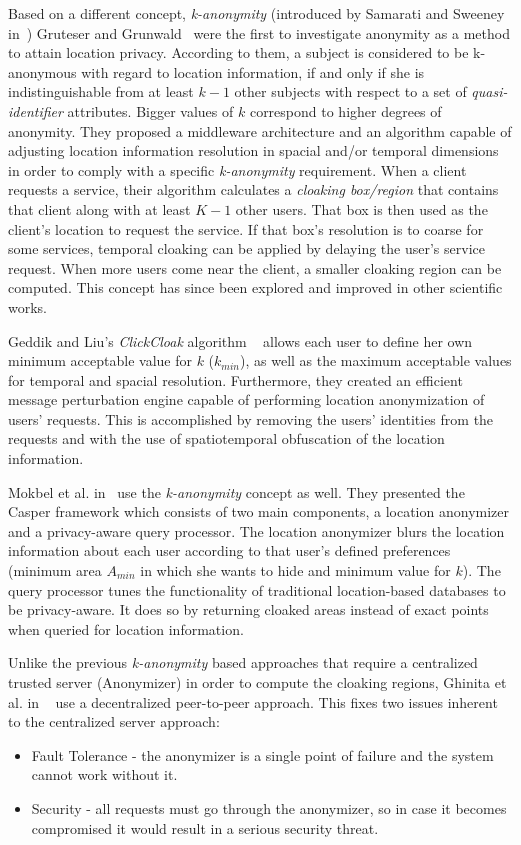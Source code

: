 Based on a different concept, \emph{k-anonymity} (introduced by
Samarati and Sweeney in~\cite{samarati1998protecting}) Gruteser and
Grunwald~\cite{gruteser2003anonymous} were the first to investigate
anonymity as a method to attain location privacy. According to them, a
subject is considered to be k-anonymous with regard to location
information, if and only if she is indistinguishable from at least
$k-1$ other subjects with respect to a set of
\emph{quasi-identifier} attributes. Bigger values of $k$ correspond to higher degrees of
anonymity. They proposed a middleware architecture and an algorithm
capable of adjusting location information resolution in spacial and/or
temporal dimensions in order to comply with a specific
\emph{k-anonymity} requirement. When a client requests a service,
their algorithm calculates a \emph{cloaking box/region} that contains
that client along with at least $K-1$ other users. That box is then
used as the client's location to request the service. If that box's
resolution is to coarse for some services, temporal cloaking can be
applied by delaying the user's service request. When more users come
near the client, a smaller cloaking region can be computed. This concept
has since been explored and improved in other scientific works.

Geddik and Liu's
\emph{ClickCloak} algorithm
~\cite{gedik2005location,gedik2008protecting} allows each user to
define her own minimum acceptable value for $k$ ($k_{min}$), as well
as the maximum acceptable values for temporal and spacial resolution.
Furthermore, they created an efficient message perturbation engine
capable of performing location anonymization of users' requests.
This is accomplished by removing the users' identities from the
requests and with the use of spatiotemporal obfuscation of the
location information.

Mokbel et al. in~\cite{mokbel2006new} use the \emph{k-anonymity}
concept as well.  They presented the Casper framework which consists of
two main components, a location anonymizer and a privacy-aware query
processor.  The location anonymizer blurs the location information
about each user according to that user's defined preferences (minimum
area $A_{min}$ in which she wants to hide and minimum value for
$k$). The query processor tunes the functionality of traditional
location-based databases to be privacy-aware. It does so by returning
cloaked areas instead of exact points when queried for location
information.

Unlike the previous \emph{k-anonymity} based approaches that require a
centralized trusted server (Anonymizer) in order to compute the cloaking
regions, Ghinita et al. in ~\cite{ghinita2007prive} use a
decentralized peer-to-peer approach. This fixes two issues inherent to
the centralized server approach:
\begin{itemize}
\item Fault Tolerance -  the
anonymizer is a single point of failure and the system cannot work
without it.
\item Security - all requests must go through the anonymizer, so in
  case it becomes compromised it would result in a serious security
  threat.
\end{itemize}

